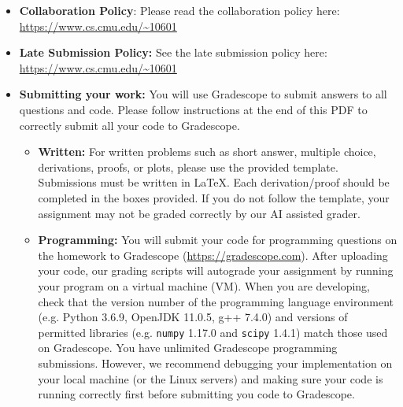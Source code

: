 \documentclass[11pt,addpoints,answers]{exam}
\begin{document}
\begin{itemize}

\item \textbf{Collaboration Policy}: Please read the collaboration policy here: \url{https://www.cs.cmu.edu/~10601}

\item\textbf{Late Submission Policy:} See the late submission policy here: \url{https://www.cs.cmu.edu/~10601}

\item\textbf{Submitting your work:} You will use Gradescope to submit
  answers to all questions and code. Please
  follow instructions at the end of this PDF to correctly submit all your code to Gradescope.

  \begin{itemize}
    
\begin{comment}
  \item \textbf{Canvas:} Canvas (\url{https://canvas.cmu.edu}) will be
    used for quiz-style problems (e.g. multiple choice, true / false,
    numerical answers). Grading is done automatically.
    You may only \textbf{submit once} on canvas, so be sure of your
    answers before you submit. However, canvas allows you to work on
    your answers and then close out of the page and it will save your
    progress.  You will not be granted additional submissions, so
    please be confident of your solutions when you are submitting your
    assignment.
    {\color{red} The above is true for future assignments, but this one
    allows {\bf unlimited submissions}.}
\end{comment}
    
   \item \textbf{Written:} For written problems such as short answer, multiple choice, derivations, proofs, or plots, please use the provided template. Submissions must be written in LaTeX.
   Each derivation/proof should be completed in the boxes provided. If you do not follow the template, your assignment may not be graded correctly by our AI assisted grader.

  \item \textbf{Programming:} You will submit your code for programming questions on the homework to Gradescope (\url{https://gradescope.com}). After uploading your code, our grading scripts will autograde your assignment by running your program on a virtual machine (VM). When you are developing, check that the version number of the programming language environment (e.g. Python 3.6.9, OpenJDK 11.0.5, g++ 7.4.0) and versions of permitted libraries (e.g.  \texttt{numpy} 1.17.0 and \texttt{scipy} 1.4.1) match those used on Gradescope. You have unlimited Gradescope programming submissions. However, we recommend debugging your implementation on your local machine (or the Linux servers) and making sure your code is running correctly first before submitting you code to Gradescope.


\end{itemize}
\end{itemize}
\end{document}
